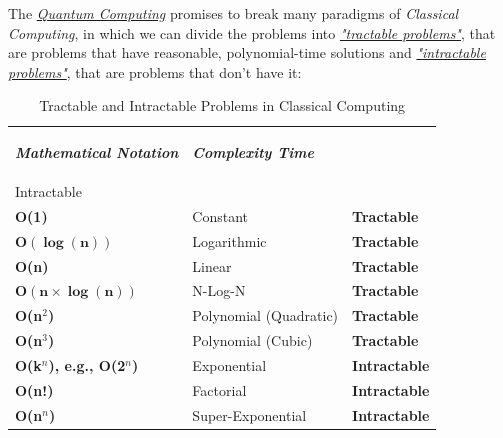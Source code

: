 \documentclass[conference]{IEEEtran}
\begin{document}
The \href{https://en.wikipedia.org/wiki/Quantum_computing}{\textit{Quantum Computing}} promises to break many paradigms of \textit{Classical Computing}, in which we can divide the problems into \href{http://www.cs.ucc.ie/~dgb/courses/toc/handout29.pdf}{\textit{"tractable problems"}}, that are problems that have reasonable, polynomial-time solutions and \href{http://www.cs.ucc.ie/~dgb/courses/toc/handout29.pdf}{\textit{"intractable problems"}}, that are problems that don't have it:

\begin{table}[!hp]
\centering
    \caption{Tractable and Intractable Problems in Classical Computing}
    \begin{tabular}{ |p{2.2cm}|p{3cm}|p{2.2cm}| }
     \hline
     \begin{center}\textbf{\textit{Mathematical Notation}}\end{center} & \begin{center}\textbf{\textit{Complexity Time}}\end{center} & \begin{center}\textbf{\textit{Tractable/\\Intractable}}\end{center}\\
     \hline
     \hline
     \textbf{O(1)} & Constant & \textbf{Tractable} \\
     \hline
     $\bm{O(\log(n))}$ & Logarithmic & \textbf{Tractable} \\
     \hline
     \textbf{O(n)} & Linear & \textbf{Tractable} \\
     \hline
     $\bm{O(n\times\log(n))}$ & N-Log-N & \textbf{Tractable} \\
     \hline
     \textbf{O(n$^{2}$)} & Polynomial (Quadratic) & \textbf{Tractable} \\
     \hline
     \textbf{O(n$^{3}$)} & Polynomial (Cubic) & \textbf{Tractable} \\
     \hline
     \hline
     \textbf{O(k$^{n}$), e.g., O(2$^{n}$)} & Exponential & \textbf{Intractable} \\
     \hline
     \textbf{O(n!)} & Factorial & \textbf{Intractable} \\
     \hline
     \textbf{O(n$^{n}$)} & Super-Exponential & \textbf{Intractable} \\
     \hline
    \end{tabular}
\end{table}

\vspace{4pt}
\end{document}
